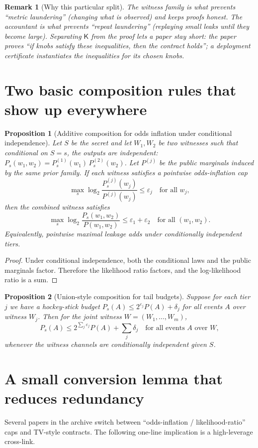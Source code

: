 \documentclass[11pt]{article}
\newtheorem{proposition}{Proposition}
\newtheorem{remark}{Remark}
\newcommand{\eps}{\varepsilon}
\newcommand{\logtwo}{\log_2}
\begin{document}
\begin{remark}[Why this particular split]
The witness family is what prevents ``metric laundering'' (changing what is observed) and keeps proofs honest.
The accountant is what prevents ``repeat laundering'' (replaying small leaks until they become large).
Separating $\mathsf K$ from the proof lets a paper stay short: the paper proves ``if knobs satisfy these inequalities, then the contract holds'';
a deployment certificate instantiates the inequalities for its chosen knobs.
\end{remark}

\section{Two basic composition rules that show up everywhere}
\begin{proposition}[Additive composition for odds inflation under conditional independence]\label{prop:additive}
Let $S$ be the secret and let $W_1,W_2$ be two witnesses such that conditional on $S=s$,
the outputs are independent: $P_s(w_1,w_2)=P_s^{(1)}(w_1)\,P_s^{(2)}(w_2)$.
Let $P^{(j)}$ be the public marginals induced by the same prior family.
If each witness satisfies a pointwise odds-inflation cap
\[
\max_s \logtwo\frac{P_s^{(j)}(w_j)}{P^{(j)}(w_j)}\le \eps_j \quad\text{for all } w_j,
\]
then the combined witness satisfies
\[
\max_s \logtwo\frac{P_s(w_1,w_2)}{P(w_1,w_2)}\le \eps_1+\eps_2
\quad\text{for all }(w_1,w_2).
\]
Equivalently, pointwise maximal leakage adds under conditionally independent tiers.
\end{proposition}

\begin{proof}
Under conditional independence, both the conditional laws and the public marginals factor.
Therefore the likelihood ratio factors, and the log-likelihood ratio is a sum.
\end{proof}

\begin{proposition}[Union-style composition for tail budgets]\label{prop:union}
Suppose for each tier $j$ we have a hockey-stick budget
$P_s(A)\le 2^{\eps_j}P(A)+\delta_j$ for all events $A$ over witness $W_j$.
Then for the joint witness $W=(W_1,\dots,W_m)$,
\[
P_s(A)\le 2^{\sum_j \eps_j}P(A)+\sum_j \delta_j
\quad\text{for all events }A \text{ over } W,
\]
whenever the witness channels are conditionally independent given $S$.
\end{proposition}

\section{A small conversion lemma that reduces redundancy}
Several papers in the archive switch between ``odds-inflation / likelihood-ratio'' caps and TV-style contracts.
The following one-line implication is a high-leverage cross-link.
\end{document}
